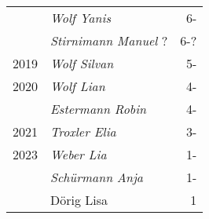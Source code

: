 {\begin{longtable}{ l l r }
                      & \emph{Wolf Yanis}                         & 6-          \\
                      & \emph{Stirnimann Manuel} ?                & 6-?         \\
        2019          & \emph{Wolf Silvan}                        & 5-          \\
        2020          & \emph{Wolf Lian}                          & 4-          \\
                      & \emph{Estermann Robin}                    & 4-          \\
        2021          & \emph{Troxler Elia}                       & 3-          \\
        2023          & \emph{Weber Lia}                          & 1-          \\
                      & \emph{Schürmann Anja}                     & 1-          \\
                      & Dörig Lisa                                & 1           \\
    \end{longtable}
    \unskip
    \unpenalty
    \unpenalty}


\begin{history}
    \unvbox\mitgliederbox
\end{history}

